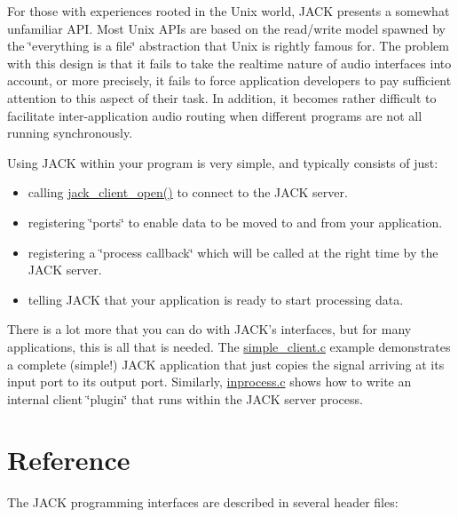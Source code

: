 For those with experiences rooted in the Unix world, JACK presents a somewhat unfamiliar API. Most Unix APIs are based on the read/write model spawned by the \char`\"{}everything is a file\char`\"{} abstraction that Unix is rightly famous for. The problem with this design is that it fails to take the realtime nature of audio interfaces into account, or more precisely, it fails to force application developers to pay sufficient attention to this aspect of their task. In addition, it becomes rather difficult to facilitate inter-application audio routing when different programs are not all running synchronously.

Using JACK within your program is very simple, and typically consists of just:

\begin{itemize}
\item calling \hyperlink{jack_8h_60174a8321e2d9c4e7e444e779e78e6b}{jack\_\-client\_\-open()} to connect to the JACK server.\item registering \char`\"{}ports\char`\"{} to enable data to be moved to and from your application.\item registering a \char`\"{}process callback\char`\"{} which will be called at the right time by the JACK server.\item telling JACK that your application is ready to start processing data.\end{itemize}


There is a lot more that you can do with JACK's interfaces, but for many applications, this is all that is needed. The \hyperlink{simple__client_8c}{simple\_\-client.c} example demonstrates a complete (simple!) JACK application that just copies the signal arriving at its input port to its output port. Similarly, \hyperlink{inprocess_8c}{inprocess.c} shows how to write an internal client \char`\"{}plugin\char`\"{} that runs within the JACK server process.\hypertarget{index_reference}{}\section{Reference}\label{index_reference}
The JACK programming interfaces are described in several header files:

